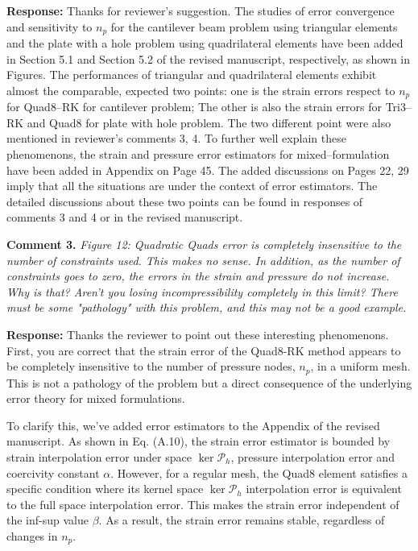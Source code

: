 \documentclass{article}
\begin{document}
\textbf{Response:}
Thanks for reviewer's suggestion. The studies of error convergence and sensitivity to $n_p$ for the cantilever beam problem using triangular elements and the plate with a hole problem using quadrilateral elements have been added in Section 5.1 and Section 5.2 of the revised manuscript, respectively, as shown in Figures.
The performances of triangular and quadrilateral elements exhibit almost the comparable,
expected two points: one is the strain errors respect to $n_p$ for Quad8--RK for cantilever problem; The other is also the strain errors for Tri3--RK and Quad8 for plate with hole problem. The two different point were also mentioned in reviewer's comments 3, 4. 
To further well explain these phenomenons, the strain and pressure error estimators for mixed--formulation have been added in Appendix on Page 45.
The added discussions on Pages 22, 29 imply that all the situations are under the context of error estimators.
The detailed discussions about these two points can be found in responses of comments 3 and 4 or in the revised manuscript.

\textbf{Comment 3.} \textit{Figure 12: Quadratic Quads error is completely insensitive to the number of constraints used. This makes no sense. In addition, as the number of constraints goes to zero, the errors in the strain and pressure do not increase. Why is that? Aren't you losing incompressibility completely in this limit? There must be some "pathology" with this problem, and this may not be a good example.}

\textbf{Response:} 
Thanks the reviewer to point out these interesting phenomenons.
First, you are correct that the strain error of the Quad8-RK method appears to be completely insensitive to the number of pressure nodes, $n_p$, in a uniform mesh. This is not a pathology of the problem but a direct consequence of the underlying error theory for mixed formulations.

To clarify this, we've added error estimators to the Appendix of the revised manuscript. As shown in Eq. (A.10), the strain error estimator is bounded by strain interpolation error under space $\ker \mathcal P_h$, pressure interpolation error and coercivity constant $\alpha$.
However, for a regular mesh, the Quad8 element satisfies a specific condition where its kernel space $\ker \mathcal P_h$ interpolation error is equivalent to the full space interpolation error. This makes the strain error independent of the inf-sup value $\beta$.
As a result, the strain error remains stable, regardless of changes in $n_p$.
\end{document}
